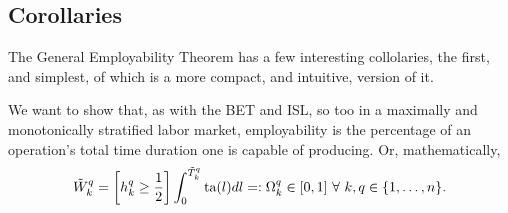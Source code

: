 \documentclass[hidelinks, nonatbib]{elsarticle}
\begin{document}
\subsection{Corollaries}
The General Employability Theorem has a few interesting collolaries, the first, and simplest, of which is a more compact, and intuitive, version of it.
\begin{corollary}
    We want to show that, as with the BET and ISL, so too in a maximally and monotonically stratified labor market, employability is the percentage of an operation's total time duration one is capable of producing. Or, mathematically,
    \begin{gather}
        \tilde{W}_{k}^{q}
        =
        \left[
                h_{k}^{q}
                \geq
                \frac{1}{2}
        \right]
        \int_{0}^{\tilde{T}_{k}^{q}}
        \text{ta}(l)
        dl
        =:
        \Omega_{k}^{q}
        \in 
        [0,1]
        \
        \forall
        \
        k,q \in \{1, \dots, n\}
        .
    \end{gather}


\end{corollary}
\end{document}
